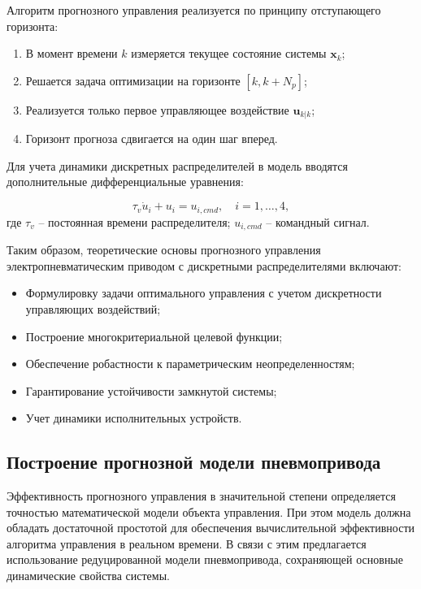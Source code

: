 Алгоритм прогнозного управления реализуется по принципу отступающего горизонта:

\begin{enumerate}
	\item  В момент времени $k$ измеряется текущее состояние системы $\mathbf{x}_k$;
	\item  Решается задача оптимизации на горизонте $[k, k+N_p]$;
	\item  Реализуется только первое управляющее воздействие $\mathbf{u}_{k|k}$;
	\item  Горизонт прогноза сдвигается на один шаг вперед.

\end{enumerate}

Для учета динамики дискретных распределителей в модель вводятся дополнительные дифференциальные уравнения:

\begin{equation}
	\tau_v\dot{u}_i + u_i = u_{i,cmd}, \quad i = 1,\ldots,4,
\end{equation}
где $\tau_v$ -- постоянная времени распределителя;
$u_{i,cmd}$ -- командный сигнал.

Таким образом, теоретические основы прогнозного управления электропневматическим приводом с дискретными распределителями включают:

\begin{itemize}
	\item Формулировку задачи оптимального управления с учетом дискретности управляющих воздействий;
	\item Построение многокритериальной целевой функции;
	\item Обеспечение робастности к параметрическим неопределенностям;
	\item Гарантирование устойчивости замкнутой системы;
	\item Учет динамики исполнительных устройств.

\end{itemize}
\subsection{Построение прогнозной модели пневмопривода}\label{subsec:ch3/sec5/sub2}

Эффективность прогнозного управления в значительной степени определяется точностью
математической модели объекта управления. При этом модель должна обладать достаточной
простотой для обеспечения вычислительной эффективности алгоритма управления в
реальном времени. В связи с этим предлагается использование редуцированной
модели пневмопривода, сохраняющей основные динамические свойства системы.

